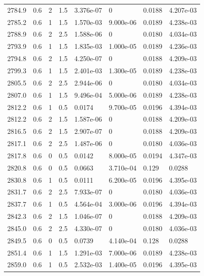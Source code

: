 \documentclass[preview]{standalone}
\begin{document}
{{{{{{{{{{\begin{tabular}{L{1.2cm}C{1.2cm} C{0.3cm}C{0.5cm} C{1.4cm}C{1.4cm} C{1.4cm}C{1.4cm}}
  2784.9  &   0.6  & 2     & 1.5 &  3.376e-07  & 0  & 0.0188 &  4.207e-03   \\ 
  2785.2  &   0.6  & 1     & 1.5 &  1.570e-03  & 9.000e-06  & 0.0189 &  4.238e-03   \\ 
  2788.9  &   0.6  & 2     & 2.5 &  1.588e-06  & 0  & 0.0180 &  4.034e-03   \\ 
  2793.9  &   0.6  & 1     & 1.5 &  1.835e-03  & 1.000e-05  & 0.0189 &  4.236e-03   \\ 
  2794.8  &   0.6  & 2     & 1.5 &  4.250e-07  & 0  & 0.0188 &  4.209e-03   \\ 
  2799.3  &   0.6  & 1     & 1.5 &  2.401e-03  & 1.300e-05  & 0.0189 &  4.238e-03   \\ 
  2805.5  &   0.6  & 2     & 2.5 &  2.944e-06  & 0  & 0.0180 &  4.034e-03   \\ 
  2807.0  &   0.6  & 1     & 1.5 &  9.496e-04  & 5.000e-06  & 0.0189 &  4.238e-03   \\ 
  2812.2  &   0.6  & 1     & 0.5 &  0.0174  & 9.700e-05  & 0.0196 &  4.394e-03   \\ 
  2812.2  &   0.6  & 2     & 1.5 &  1.587e-06  & 0  & 0.0188 &  4.209e-03   \\ 
  2816.5  &   0.6  & 2     & 1.5 &  2.907e-07  & 0  & 0.0188 &  4.209e-03   \\ 
  2817.1  &   0.6  & 2     & 2.5 &  1.487e-06  & 0  & 0.0180 &  4.036e-03   \\ 
  2817.8  &   0.6  & 0     & 0.5 &  0.0142  & 8.000e-05  & 0.0194 &  4.347e-03   \\ 
  2820.8  &   0.6  & 0     & 0.5 &  0.0663  & 3.710e-04  & 0.129 &  0.0288   \\ 
  2830.8  &   0.6  & 1     & 0.5 &  0.0111  & 6.200e-05  & 0.0196 &  4.395e-03   \\ 
  2831.7  &   0.6  & 2     & 2.5 &  7.933e-07  & 0  & 0.0180 &  4.036e-03   \\ 
  2837.7  &   0.6  & 1     & 0.5 &  4.564e-04  & 3.000e-06  & 0.0196 &  4.394e-03   \\ 
  2842.3  &   0.6  & 2     & 1.5 &  1.046e-07  & 0  & 0.0188 &  4.209e-03   \\ 
  2845.0  &   0.6  & 2     & 2.5 &  4.330e-07  & 0  & 0.0180 &  4.036e-03   \\ 
  2849.5  &   0.6  & 0     & 0.5 &  0.0739  & 4.140e-04  & 0.128 &  0.0288   \\ 
  2851.4  &   0.6  & 1     & 1.5 &  1.291e-03  & 7.000e-06  & 0.0189 &  4.238e-03   \\ 
  2859.0  &   0.6  & 1     & 0.5 &  2.532e-03  & 1.400e-05  & 0.0196 &  4.395e-03   \\ 

\end{tabular}}}}}}}}}}}
\end{document}
